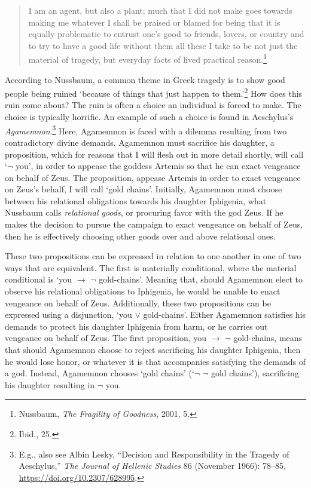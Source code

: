 \documentclass[
  12pt,
]{book}
\theoremstyle{definition}
\theoremstyle{definition}
\theoremstyle{definition}
\theoremstyle{definition}
\theoremstyle{remark}
\begin{document}
\begin{quote}
I am an agent, but also a plant; much that I did not make goes towards making me whatever I shall be praised or blamed for being that it is equally problematic to entrust one's good to friends, lovers, or country and to try to have a good life without them all these I take to be not just the material of tragedy, but everyday facts of lived practical reason.\footnote{Nussbaum, \emph{The {Fragility} of {Goodness}}, 2001, 5.}
\end{quote}

According to Nussbaum, a common theme in Greek tragedy is to show good people being ruined `because of things that just happen to them.'\footnote{Ibid., 25.} How does this ruin come about? The ruin is often a choice an individual is forced to make. The choice is typically horrific. An example of such a choice is found in Aeschylus's \emph{Agamemnon}.\footnote{E.g., also see Albin Lesky, {``Decision and {Responsibility} in the {Tragedy} of {Aeschylus},''} \emph{The Journal of Hellenic Studies} 86 (November 1966): 78--85, \url{https://doi.org/10.2307/628995}.} Here, Agamemnon is faced with a dilemma resulting from two contradictory divine demands. Agamemnon must sacrifice his daughter, a proposition, which for reasons that I will flesh out in more detail shortly, will call `\(\lnot\) you', in order to appease the goddess Artemis so that he can exact vengeance on behalf of Zeus. The proposition, appease Artemis in order to exact vengeance on Zeus's behalf, I will call `gold chains'. Initially, Agamemnon must choose between his relational obligations towards his daughter Iphigenia, what Nussbaum calls \emph{relational goods}, or procuring favor with the god Zeus. If he makes the decision to pursue the campaign to exact vengeance on behalf of Zeus, then he is effectively choosing other goods over and above relational ones.

These two propositions can be expressed in relation to one another in one of two ways that are equivalent. The first is materially conditional, where the material conditional is `you \(\rightarrow\) \(\lnot\) gold-chains'. Meaning that, should Agamemnon elect to observe his relational obligations to Iphigenia, he would be unable to enact vengeance on behalf of Zeus. Additionally, these two propositions can be expressed using a disjunction, `you \(\lor\) gold-chains'. Either Agamemnon satisfies his demands to protect his daughter Iphigenia from harm, or he carries out vengeance on behalf of Zeus. The first proposition, you \(\rightarrow\) \(\lnot\) gold-chains, means that should Agamemnon choose to reject sacrificing his daughter Iphigenia, then he would lose honor, or whatever it is that accompanies satisfying the demands of a god. Instead, Agamemnon chooses `gold chains' (`\(\lnot\) \(\lnot\) gold chains'), sacrificing his daughter resulting in \(\lnot\) you.
\end{document}

